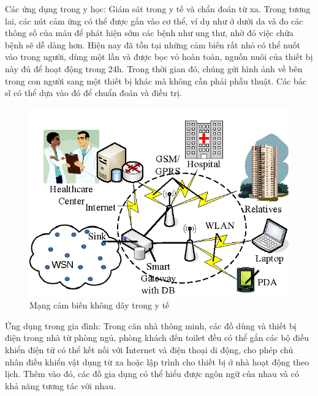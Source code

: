 \documentclass{report}
\begin{document}
Các ứng dụng trong y học: Giám sát trong y tế và chẩn đoán từ xa. Trong tương lai, các nút
cảm ứng có thể được gắn vào cơ thể, ví dụ như ở dưới da và đo các thông số của máu để phát
hiện sớm các bệnh như ung thư, nhờ đó việc chữa bệnh sẽ dễ dàng hơn. Hiện nay đã tồn tại
những cảm biến rất nhỏ có thể nuốt vào trong người, dùng một lần và được bọc vỏ hoàn toàn,
nguồn nuôi của thiết bị này đủ để hoạt động trong 24h. Trong thời gian đó, chúng
gửi hình ảnh về bên trong con người sang một thiết bị khác mà không cần phải phẫu thuật.
Các bác sĩ có thể dựa vào đó để chuẩn đoán và điều trị.
\begin{figure}[h]
	\centering
	\includegraphics[scale = 0.4]{fig7.png}
	\caption{Mạng cảm biến không dây trong y tế}
	\label{fig:Graph7}
\end{figure}
\newpage
Ứng dụng trong gia đình: Trong căn nhà thông minh, các đồ dùng và thiết bị điện trong nhà từ phòng ngủ, phòng khách đến toilet đều có thể gắn các bộ điều khiển điện tử có thể kết nối với Internet và điện thoại di động, cho phép chủ nhân điều khiển vật dụng từ xa hoặc lập trình cho thiết bị ở nhà hoạt động theo lịch. Thêm vào đó, các đồ gia dụng có thể hiểu được ngôn ngữ của nhau và có khả năng tương tác với nhau.
\end{document}
